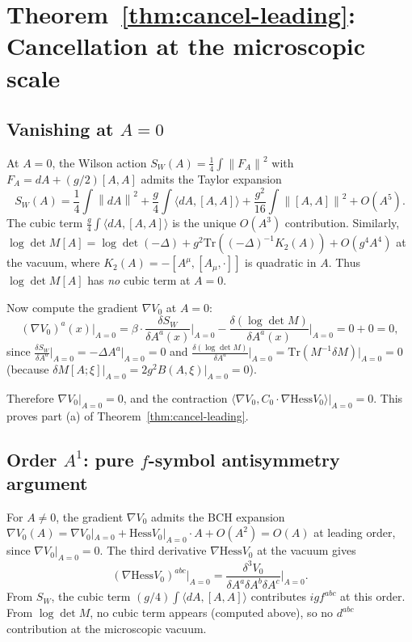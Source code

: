 \documentclass[11pt,a4paper]{amsart}
\theoremstyle{definition}
\newcommand{\norm}[1]{\left\lVert#1\right\rVert}
\newcommand{\Tr}{\mathrm{Tr}}
\newcommand{\Hess}{\mathrm{Hess}}
\begin{document}
\section{Theorem~\ref{thm:cancel-leading}: Cancellation at the microscopic scale}\label{sec:fabc}

\subsection{Vanishing at $A = 0$}\label{ssec:cancel-A0}

At $A = 0$, the Wilson action $S_W(A) = \frac{1}{4}\int \norm{F_A}^2$ with
$F_A = dA + (g/2)[A, A]$ admits the Taylor expansion
\[
S_W(A) = \frac{1}{4}\int \norm{dA}^2 + \frac{g}{4}\int \langle dA, [A, A]\rangle + \frac{g^2}{16}\int \norm{[A, A]}^2 + O(A^5).
\]
The cubic term $\frac{g}{4}\int \langle dA, [A, A]\rangle$ is the unique
$O(A^3)$ contribution. Similarly,
$\log\det M[A] = \log\det(-\Delta) + g^2 \Tr((-\Delta)^{-1} K_2(A)) + O(g^4 A^4)$ at the vacuum,
where $K_2(A) = -[A^\mu, [A_\mu, \cdot]]$ is quadratic in $A$. Thus
$\log\det M[A]$ has \emph{no} cubic term at $A = 0$.

Now compute the gradient $\nabla V_0$ at $A = 0$:
\[
(\nabla V_0)^a(x)\Big|_{A=0}
= \beta \cdot \frac{\delta S_W}{\delta A^a(x)}\Bigr|_{A=0}
- \frac{\delta(\log\det M)}{\delta A^a(x)}\Bigr|_{A=0}
= 0 + 0 = 0,
\]
since $\frac{\delta S_W}{\delta A^a}\bigr|_{A=0} = -\Delta A^a\bigr|_{A=0} = 0$
and $\frac{\delta(\log\det M)}{\delta A^a}\bigr|_{A=0} = \Tr(M^{-1} \delta M)|_{A=0} = 0$
(because $\delta M[A;\xi]\bigr|_{A=0} = 2g^2 B(A,\xi)\bigr|_{A=0} = 0$).

Therefore $\nabla V_0|_{A=0} = 0$, and the contraction
$\langle \nabla V_0, C_0 \cdot \nabla \Hess V_0\rangle|_{A=0} = 0$.
This proves part (a) of Theorem~\ref{thm:cancel-leading}.

\subsection{Order $A^1$: pure $f$-symbol antisymmetry argument}

For $A \neq 0$, the gradient $\nabla V_0$ admits the BCH expansion
$\nabla V_0(A) = \nabla V_0|_{A=0} + \Hess V_0|_{A=0} \cdot A + O(A^2)
= O(A)$ at leading order, since $\nabla V_0|_{A=0} = 0$.
The third derivative $\nabla \Hess V_0$ at the vacuum gives
\[
(\nabla \Hess V_0)^{abc}|_{A=0}
= \frac{\delta^3 V_0}{\delta A^a \delta A^b \delta A^c}\Bigr|_{A=0}.
\]
From $S_W$, the cubic term $(g/4)\int \langle dA, [A, A]\rangle$
contributes $i g f^{abc}$ at this order. From $\log\det M$, no cubic
term appears (computed above), so no $d^{abc}$ contribution at the
microscopic vacuum.
\end{document}

